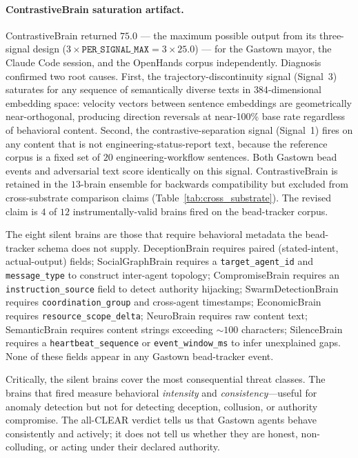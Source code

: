 \paragraph{ContrastiveBrain saturation artifact.}
ContrastiveBrain returned $75.0$ --- the maximum possible output from
its three-signal design ($3 \times \texttt{PER\_SIGNAL\_MAX} = 3 \times 25.0$)
--- for the Gastown mayor, the Claude Code session, and the OpenHands
corpus independently. Diagnosis confirmed two root causes. First, the
trajectory-discontinuity signal (Signal~3) saturates for any sequence of
semantically diverse texts in $384$-dimensional embedding space: velocity
vectors between sentence embeddings are geometrically near-orthogonal,
producing direction reversals at near-100\% base rate regardless of
behavioral content. Second, the contrastive-separation signal (Signal~1)
fires on any content that is not engineering-status-report text, because
the reference corpus is a fixed set of $20$ engineering-workflow sentences.
Both Gastown bead events and adversarial text score identically on this
signal. ContrastiveBrain is retained in the $13$-brain ensemble for
backwards compatibility but excluded from cross-substrate comparison claims
(Table~\ref{tab:cross_substrate}). The revised claim is $4$ of $12$
instrumentally-valid brains fired on the bead-tracker corpus.

The eight silent brains are those that require behavioral metadata the
bead-tracker schema does not supply. DeceptionBrain requires paired
(stated-intent, actual-output) fields; SocialGraphBrain requires a
\texttt{target\_agent\_id} and \texttt{message\_type} to construct
inter-agent topology; CompromiseBrain requires an
\texttt{instruction\_source} field to detect authority hijacking;
SwarmDetectionBrain requires \texttt{coordination\_group} and
cross-agent timestamps; EconomicBrain requires
\texttt{resource\_scope\_delta}; NeuroBrain requires raw content text;
SemanticBrain requires content strings exceeding $\sim\!100$ characters;
SilenceBrain requires a \texttt{heartbeat\_sequence} or
\texttt{event\_window\_ms} to infer unexplained gaps. None of these
fields appear in any Gastown bead-tracker event.

Critically, the silent brains cover the most consequential threat
classes. The brains that fired measure behavioral \emph{intensity} and
\emph{consistency}---useful for anomaly detection but not for detecting
deception, collusion, or authority compromise. The all-CLEAR verdict
tells us that Gastown agents behave consistently and actively; it does
not tell us whether they are honest, non-colluding, or acting under
their declared authority.


